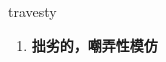 
\begin{frame}
{\huge travesty}
\begin{center}
\begin{enumerate}\Large
  \item \textbf{拙劣的，嘲弄性模仿}
\end{enumerate}
\end{center}
\end{frame}
